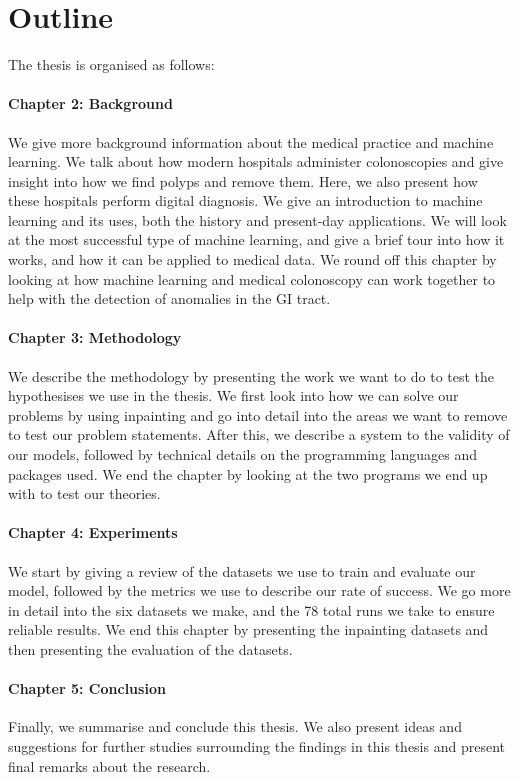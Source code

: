\section{Outline}
The thesis is organised as follows:

\paragraph{Chapter 2: Background}
We give more background information about the medical practice and machine learning.
We talk about how modern hospitals administer colonoscopies and give insight into how we find polyps and remove them. Here, we also present how these hospitals perform digital diagnosis.  
We give an introduction to machine learning and its uses, both the history and present-day applications. We will look at the most successful type of machine learning, and give a brief tour into how it works, and how it can be applied to medical data.
We round off this chapter by looking at how machine learning and medical colonoscopy can work together to help with the detection of anomalies in the GI tract.

\paragraph{Chapter 3: Methodology }
We describe the methodology by presenting the work we want to do to test the hypothesises we use in the thesis.
We first look into how we can solve our problems by using inpainting and go into detail into the areas we want to remove to test our problem statements. 
After this, we describe a system to the validity of our models, followed by technical details on the programming languages and packages used.
We end the chapter by looking at the two programs we end up with to test our theories. 


\paragraph{Chapter 4: Experiments}
We start by giving a review of the datasets we use to train and evaluate our model, followed by the metrics we use to describe our rate of success.
We go more in detail into the six datasets we make, and the 78 total runs we take to ensure reliable results.
We end this chapter by presenting the inpainting datasets and then presenting the evaluation of the datasets.


\paragraph{Chapter 5: Conclusion}
Finally, we summarise and conclude this thesis.
We also present ideas and suggestions for further studies surrounding
the findings in this thesis and present final remarks about the research.

